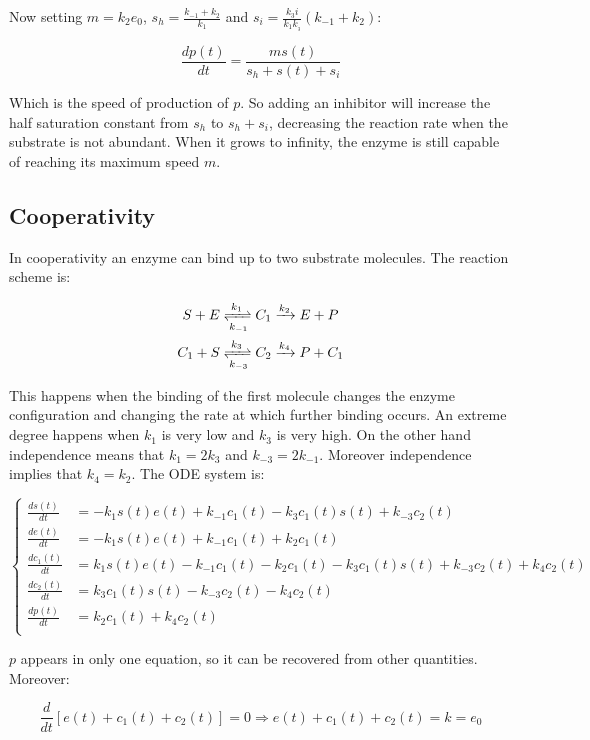     Now setting $m = k_2e_0$, $s_h = \frac{k_{-1} + k_2}{k_1}$ and $s_i = \frac{k_3i}{k_1k_{_3}}(k_{-1}+k_2)$:

    $$\frac{dp(t)}{dt} = \frac{ms(t)}{s_h + s(t) + s_i}$$

    Which is the speed of production of $p$.
    So adding an inhibitor will increase the half saturation constant from $s_h$ to $s_h+s_i$, decreasing the reaction rate when the substrate is not abundant.
    When it grows to infinity, the enzyme is still capable of reaching its maximum speed $m$.

  \subsection{Cooperativity}
  In cooperativity an enzyme can bind up to two substrate molecules.
  The reaction scheme is:

  \begin{align*}
    S + E &\xrightleftharpoons[k_{-1}]{k_1} C_1 \xrightarrow{k_2} E + P\\
    C_1 + S &\xrightleftharpoons[k_{-3}]{k_3} C_2\xrightarrow{k_4} P + C_1\\
  \end{align*}

  This happens when the binding of the first molecule changes the enzyme configuration and changing the rate at which further binding occurs.
  An extreme degree happens when $k_1$ is very low and $k_3$ is very high.
  On the other hand independence means that $k_1 = 2k_3$ and $k_{-3} = 2k_{-1}$.
  Moreover independence implies that $k_4 = k_2$.
  The ODE system is:

  $$\begin{cases}
    \frac{ds(t)}{dt} &= -k_1s(t)e(t) + k_{-1}c_1(t) -k_3c_1(t)s(t) + k_{-3}c_2(t)\\
    \frac{de(t)}{dt} &= -k_1s(t)e(t) + k_{-1}c_1(t) + k_2c_1(t)\\
    \frac{dc_1(t)}{dt} &= k_1s(t)e(t) - k_{-1}c_1(t) - k_2c_1(t) - k_3c_1(t)s(t) + k_{-3}c_2(t) + k_4c_2(t)\\
    \frac{dc_2(t)}{dt} &= k_3c_1(t)s(t) - k_{-3}c_2(t) - k_4c_2(t)\\
    \frac{dp(t)}{dt} &= k_2c_1(t) + k_4c_2(t)\\
  \end{cases}$$

  $p$ appears in only one equation, so it can be recovered from other quantities.
  Moreover:

  $$\frac{d}{dt}[e(t) + c_1(t) + c_2(t)] = 0\Rightarrow e(t)+c_1(t) + c_2(t) = k = e_0$$

